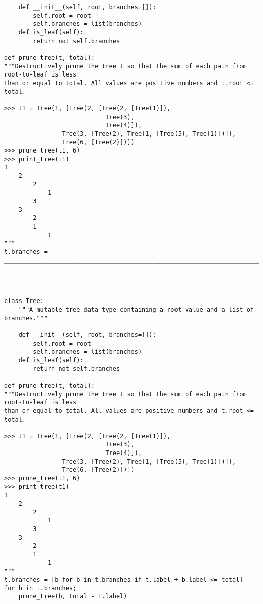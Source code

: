 \documentclass{exam}
\begin{document}
\begin{questions}
\begin{blocksection}
\begin{lstlisting}
	def __init__(self, root, branches=[]):
		self.root = root
		self.branches = list(branches)
	def is_leaf(self):
		return not self.branches

def prune_tree(t, total):
"""Destructively prune the tree t so that the sum of each path from root-to-leaf is less
than or equal to total. All values are positive numbers and t.root <= total.

>>> t1 = Tree(1, [Tree(2, [Tree(2, [Tree(1)]),
							Tree(3),
							Tree(4)]),
				Tree(3, [Tree(2), Tree(1, [Tree(5), Tree(1)])]),
				Tree(6, [Tree(2)])])
>>> prune_tree(t1, 6)
>>> print_tree(t1)
1
	2
		2
			1
		3
	3
		2
		1
			1
"""
t.branches = _______________________________________________________________________________
____________________________________________________________________________________________
	____________________________________________________________________________________________
\end{lstlisting}
\end{blocksection}
\begin{solution}
\begin{lstlisting}
class Tree:
	"""A mutable tree data type containing a root value and a list of branches."""
	
	def __init__(self, root, branches=[]):
		self.root = root
		self.branches = list(branches)
	def is_leaf(self):
		return not self.branches

def prune_tree(t, total):
"""Destructively prune the tree t so that the sum of each path from root-to-leaf is less
than or equal to total. All values are positive numbers and t.root <= total.

>>> t1 = Tree(1, [Tree(2, [Tree(2, [Tree(1)]),
							Tree(3),
							Tree(4)]),
				Tree(3, [Tree(2), Tree(1, [Tree(5), Tree(1)])]),
				Tree(6, [Tree(2)])])
>>> prune_tree(t1, 6)
>>> print_tree(t1)
1
	2
		2
			1
		3
	3
		2
		1
			1
"""
t.branches = [b for b in t.branches if t.label + b.label <= total]
for b in t.branches;
	prune_tree(b, total - t.label)
\end{lstlisting}
\end{solution}
\end{questions}
\end{document}
